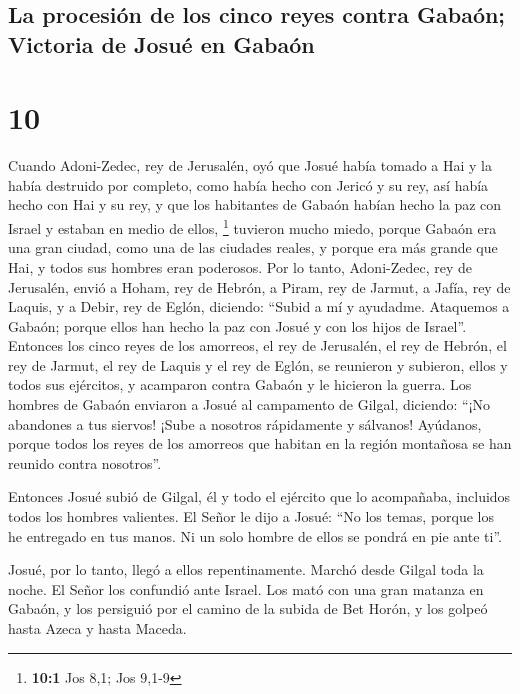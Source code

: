 \begin{paracol}{2}
{\subsection{La procesión de los cinco reyes contra Gabaón; Victoria de
Josué en
Gabaón}\label{la-procesiuxf3n-de-los-cinco-reyes-contra-gabauxf3n-victoria-de-josuuxe9-en-gabauxf3n}}

\hypertarget{section-18}{%
\section{10}\label{section-18}}

 Cuando Adoni-Zedec, rey de Jerusalén, oyó que Josué había
tomado a Hai y la había destruido por completo, como había hecho con
Jericó y su rey, así había hecho con Hai y su rey, y que los habitantes
de Gabaón habían hecho la paz con Israel y estaban en medio de ellos,
\footnote{\textbf{10:1} Jos 8,1; Jos 9,1-9}  tuvieron
mucho miedo, porque Gabaón era una gran ciudad, como una de las ciudades
reales, y porque era más grande que Hai, y todos sus hombres eran
poderosos.  Por lo tanto, Adoni-Zedec, rey de Jerusalén,
envió a Hoham, rey de Hebrón, a Piram, rey de Jarmut, a Jafía, rey de
Laquis, y a Debir, rey de Eglón, diciendo:  ``Subid a mí y
ayudadme. Ataquemos a Gabaón; porque ellos han hecho la paz con Josué y
con los hijos de Israel''.  Entonces los cinco reyes de
los amorreos, el rey de Jerusalén, el rey de Hebrón, el rey de Jarmut,
el rey de Laquis y el rey de Eglón, se reunieron y subieron, ellos y
todos sus ejércitos, y acamparon contra Gabaón y le hicieron la guerra.
 Los hombres de Gabaón enviaron a Josué al campamento de
Gilgal, diciendo: ``¡No abandones a tus siervos! ¡Sube a nosotros
rápidamente y sálvanos! Ayúdanos, porque todos los reyes de los amorreos
que habitan en la región montañosa se han reunido contra nosotros''.

 Entonces Josué subió de Gilgal, él y todo el ejército que
lo acompañaba, incluidos todos los hombres valientes.  El
Señor le dijo a Josué: ``No los temas, porque los he entregado en tus
manos. Ni un solo hombre de ellos se pondrá en pie ante ti''.

 Josué, por lo tanto, llegó a ellos repentinamente. Marchó
desde Gilgal toda la noche.  El Señor los confundió ante
Israel. Los mató con una gran matanza en Gabaón, y los persiguió por el
camino de la subida de Bet Horón, y los golpeó hasta Azeca y hasta
Maceda.


\end{paracol}
